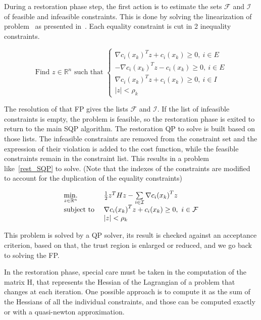 During a restoration phase step, the first action is to estimate the sets $\mathcal{F}$ and $\mathcal{I}$ of feasible  and infeasible constraints.
This is done by solving the linearization of problem~ as presented in~.
Each equality constraint is cut in 2 inequality constraints.

\begin{equation}
  \text{Find $z\in\mathbb{R}^n$ such that }
  \left\{
  \begin{array}{l}
    {\nabla c_i(x_k)}^T z+c_i(x_k)\geq 0,\ i\in E \\
    -{\nabla c_i(x_k)}^T z-c_i(x_k)\geq 0,\ i\in E \\
    {\nabla c_i(x_k)}^T z+c_i(x_k)\geq 0,\ i\in I\\
    |z|<\rho_k
  \end{array}
  \right.
\label{eq:FP}
\end{equation}

The resolution of that FP gives the lists $\mathcal{F}$ and $\mathcal{I}$.
If the list of infeasible constraints is empty, the problem is feasible, so the restoration phase is exited to return to the main SQP algorithm.
The restoration QP to solve is built based on those lists.
The infeasible constraints are removed from the constraint set and the expression of their violation is added to the cost function, while the feasible constraints remain in the constraint list.
This results in a problem like~\ref{rest_SQP} to solve.
(Note that the indexes of the constraints are modified to account for the duplication of the equality constraints)

\begin{equation}
  \begin{array}{ll}
    \operatorname*{min.}\limits_{z\in \mathbb{R}^n}{} & \frac{1}{2} z^T Hz - \sum\limits_{i\in\mathcal{I}}{\nabla c_i(x_k)}^T z \\
    \text{subject to } & {\nabla c_i(x_k)}^T z+c_i(x_k)\geq 0,\ i \in \mathcal{F} \\
                       & |z|<\rho_k
  \end{array}
\label{rest_SQP}
\end{equation}

This problem is solved by a QP solver, its result is checked against an acceptance criterion, based on that, the trust region is enlarged or reduced, and we go back to solving the FP\@.

In the restoration phase, special care must be taken in the computation of the matrix H, that represents the Hessian of the Lagrangian of a problem that changes at each iteration.
One possible approach is to compute it as the sum of the Hessians of all the individual constraints, and those can be computed exactly or with a quasi-newton approximation.


